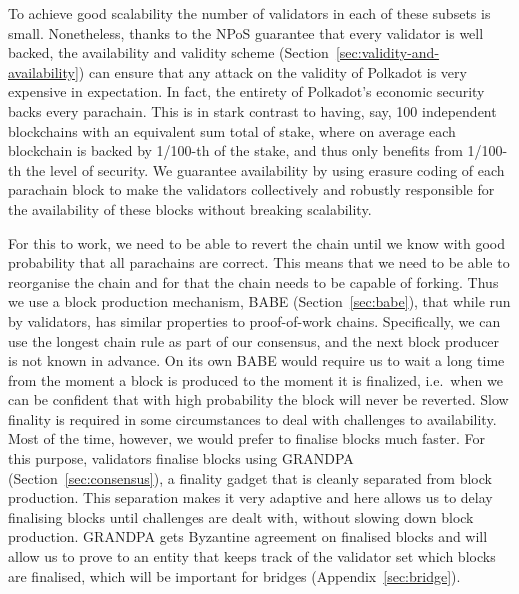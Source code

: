 To achieve good scalability the number of validators in each of these subsets is small. Nonetheless, thanks to the NPoS guarantee that every validator is well backed, the availability and validity scheme (Section~\ref{sec:validity-and-availability}) can ensure that any attack on the validity of Polkadot is very expensive in expectation. In fact, the entirety of Polkadot's economic security backs every parachain. This is in stark contrast to having, say, 100 independent blockchains with an equivalent sum total of stake, where on average each blockchain is backed by 1/100-th of the stake, and thus only benefits from 1/100-th the level of security. We guarantee availability by using erasure coding of each parachain block to make the validators collectively and robustly responsible for the availability of these blocks without breaking scalability.

For this to work, we need to be able to revert the chain until we know with good probability that all parachains are correct. This means that we need to be able to reorganise the chain and for that the chain needs to be capable of forking. Thus we use a block production mechanism, BABE (Section~\ref{sec:babe}), that while run by validators, has similar properties to proof-of-work chains. Specifically, we can use the longest chain rule as part of our consensus, and the next block producer is not known in advance. On its own BABE would require us to wait a long time from the moment a block is produced to the moment it is finalized, i.e.~when we can be confident that with high probability the block will never be reverted. Slow finality is required in some circumstances to deal with challenges to availability. Most of the time, however, we would prefer to finalise blocks much faster.  For this purpose, validators finalise blocks using GRANDPA (Section~\ref{sec:consensus}), a finality gadget that is cleanly separated from block production. This separation makes it very adaptive and here allows us to delay finalising blocks until challenges are dealt with, without slowing down block production. GRANDPA gets Byzantine agreement on finalised blocks and will allow us to prove to an entity that keeps track of the validator set which blocks are finalised, which will be important for bridges (Appendix~\ref{sec:bridge}).

